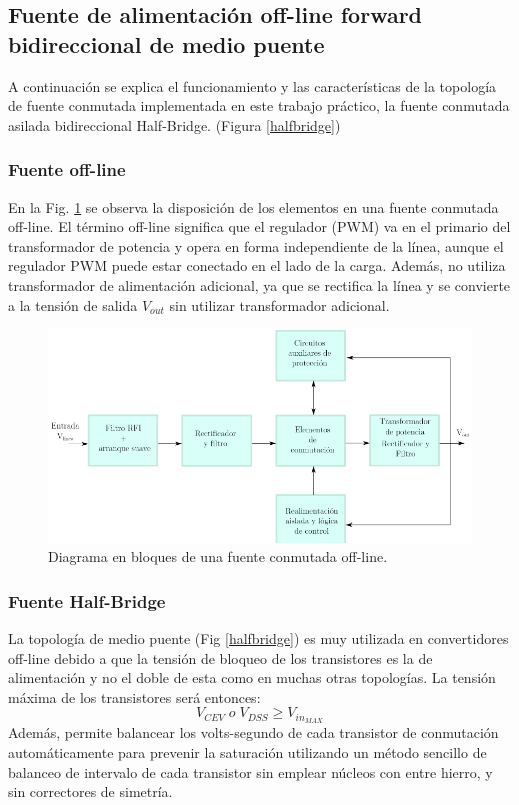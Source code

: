 \documentclass[11pt, a4paper]{article}
\begin{document}
\subsection{Fuente de alimentación off-line forward bidireccional de medio puente}
A continuación se explica el funcionamiento y las características de la topología de fuente conmutada implementada en este trabajo práctico, la fuente conmutada asilada bidireccional Half-Bridge. (Figura \ref{halfbridge})

\subsubsection{Fuente off-line}
En la Fig. \ref{esquema} se observa la disposición de los elementos en una fuente conmutada off-line. El término off-line significa que el regulador (PWM) va en el primario del transformador de potencia y opera en forma independiente de la línea, aunque el regulador PWM puede estar conectado en el lado de la carga. Además, no utiliza transformador de alimentación adicional, ya que se rectifica la línea y se convierte a la tensión de salida $V_{out}$ sin utilizar transformador adicional.
\begin{figure}[h]
	\centering
	\includegraphics[width = \textwidth]{Imagenes/esquema}
	\caption{Diagrama en bloques de una fuente conmutada off-line.}
	\label{esquema}
\end{figure}

\subsubsection{Fuente Half-Bridge}
La topología de medio puente (Fig \ref{halfbridge}) es muy utilizada en convertidores off-line debido a que la tensión de bloqueo de los transistores es la de alimentación y no el doble de esta como en muchas otras topologías. La tensión máxima de los transistores será entonces:
\[V_{CEV} \; o \; V_{DSS} \geq V_{in_{MAX}} \]
Además, permite balancear los volts-segundo de cada transistor de conmutación automáticamente para prevenir la saturación utilizando un método sencillo de balanceo de intervalo de cada transistor sin emplear núcleos con entre hierro, y sin correctores de simetría.
\end{document}
